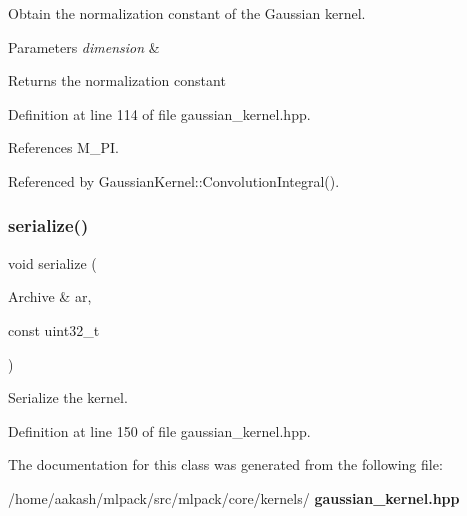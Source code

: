Obtain the normalization constant of the Gaussian kernel. 


\begin{DoxyParams}{Parameters}
{\em dimension} & \\
\hline
\end{DoxyParams}
\begin{DoxyReturn}{Returns}
the normalization constant 
\end{DoxyReturn}


Definition at line 114 of file gaussian\+\_\+kernel.\+hpp.



References M\+\_\+\+PI.



Referenced by Gaussian\+Kernel\+::\+Convolution\+Integral().

\mbox{\label{classmlpack_1_1kernel_1_1GaussianKernel_a65cba07328997659bec80b9879b15a51}} 
\subsubsection{serialize()}
{\footnotesize\ttfamily void serialize (\begin{DoxyParamCaption}\item[{Archive \&}]{ar,  }\item[{const uint32\+\_\+t}]{ }\end{DoxyParamCaption})\hspace{0.3cm}{\ttfamily [inline]}}



Serialize the kernel. 



Definition at line 150 of file gaussian\+\_\+kernel.\+hpp.



The documentation for this class was generated from the following file\+:\begin{DoxyCompactItemize}
\item 
/home/aakash/mlpack/src/mlpack/core/kernels/\textbf{ gaussian\+\_\+kernel.\+hpp}\end{DoxyCompactItemize}
